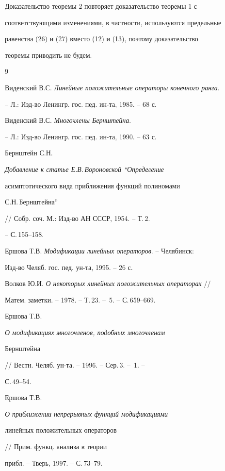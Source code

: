  


Доказательство теоремы 2 повторяет доказательство теоремы 1 с 


соответствующими изменениями, в частности, используются предельные 


равенства (26) и (27) вместо (12) и (13), поэтому доказательство 


теоремы приводить не будем. 


 


\begin{thebibliography}{9} 


 




Виденский В.С. {\em Линейные положительные операторы конечного ранга}. 


-- Л.: Изд-во Ленингр. гос. пед. ин-та, 1985. -- 68 с. 




Виденский В.С. {\em Многочлены Бернштейна}. 


-- Л.: Изд-во Ленингр. гос. пед. ин-та, 1990. -- 63 с. 




Бернштейн С.Н. {\em Добавление к статье Е.В.\,Вороновской ``Определение 


асимптотического вида приближения функций полиномами 


С.Н.\,Бернштейна''} // Собр. соч. М.: Изд-во АН СССР, 1954. -- Т.\,2. 


-- С.\,155--158. 




Ершова Т.В. {\em Модификации линейных операторов}. -- Челябинск:


Изд-во Челяб. гос. пед. ун-та, 1995. -- 26 с. 




Волков Ю.И. {\em О некоторых линейных положительных операторах} // 


Матем. заметки. -- 1978. -- Т.\,23. -- \No\,5. -- С.\,659--669. 




Ершова Т.В. {\em О модификациях многочленов, подобных многочленам 


Бернштейна} // Вестн. Челяб. ун-та. -- 1996. -- Сер.\,3. -- \No\,1. -- 


С.\,49--54. 




Ершова Т.В. {\em О приближении непрерывных функций модификациями 


линейных положительных операторов} // Прим. функц. анализа в теории 


прибл. -- Тверь, 1997. -- С.\,73--79. 


 


\end{thebibliography} 


 


\vskip 2cm 


 






 


\label{end} 


 


